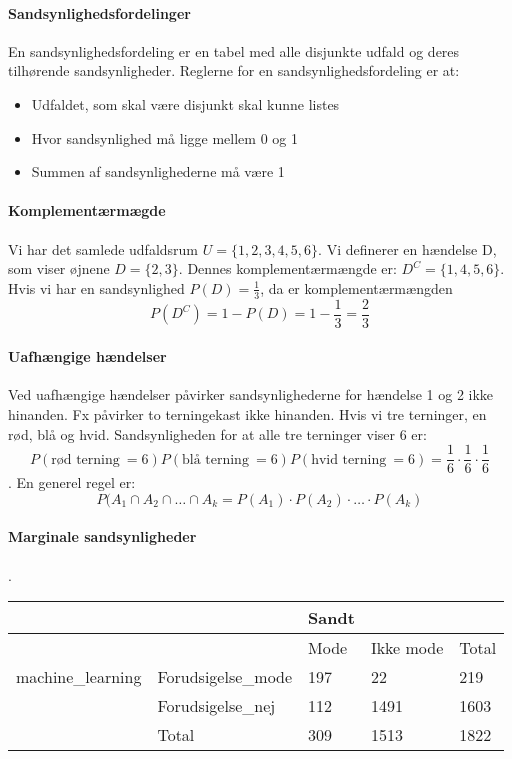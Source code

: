 \documentclass{article}
\begin{document}
\paragraph{Sandsynlighedsfordelinger}
En sandsynlighedsfordeling er en tabel med alle disjunkte udfald og deres
tilhørende sandsynligheder. Reglerne for en sandsynlighedsfordeling er at:
\begin{itemize}
  \item Udfaldet, som skal være disjunkt skal kunne listes
  \item Hvor sandsynlighed må ligge mellem 0 og 1
  \item Summen af sandsynlighederne må være 1
\end{itemize}

\paragraph{Komplementærmægde}
Vi har det samlede udfaldsrum $U = \{1, 2, 3,4,5,6\}$.  Vi definerer en hændelse
D, som viser øjnene $D = \{2,3\}$. Dennes komplementærmængde er: $D^{C} =
\{1,4,5,6\}$. Hvis vi har en sandsynlighed $P(D) = \frac{1}{3}$, da er
komplementærmængden $$P(D^C) = 1 - P(D) = 1 - \frac{1}{3} = \frac{2}{3}$$

\paragraph{Uafhængige hændelser}
Ved uafhængige hændelser påvirker sandsynlighederne for hændelse 1 og 2 ikke
hinanden. Fx påvirker to terningekast ikke hinanden. Hvis vi tre terninger, en
rød, blå og hvid. Sandsynligheden for at alle tre terninger viser 6 er:
$$P(\text{rød terning} \ =6)P(\text{blå terning} \ =6)P(\text{hvid terning} \
=6) = \frac{1}{6}\cdot \frac{1}{6} \cdot\frac{1}{6}$$.
En generel regel er:
$$P(A_1 \cap A_2 \cap \dots \cap A_k = P(A_1) \cdot P(A_2) \cdot \dots \cdot
P(A_k) $$

\paragraph{Marginale sandsynligheder}.

\begin{table}[h]
  \centering
  \begin{tabular}{l|l|l|l|l}
   &                    & Sandt  &           &        \\\hline
   &                                       & Mode   & Ikke mode & Total  \\\hline
   machine\_learning & Forudsigelse\_mode & 197 & 22    & 219 \\\hline
   & Forudsigelse\_nej  & 112 & 1491    & 1603 \\\hline
   & Total              & 309 & 1513    & 1822   
  \end{tabular}
\end{table}
\end{document}
